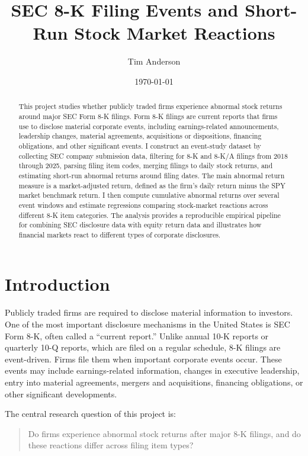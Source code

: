 \documentclass[12pt]{article}
\title{SEC 8-K Filing Events and Short-Run Stock Market Reactions}
\author{Tim Anderson}
\date{\today}
\begin{document}
	
	\maketitle
	
	\begin{abstract}
		This project studies whether publicly traded firms experience abnormal stock returns around major SEC Form 8-K filings. Form 8-K filings are current reports that firms use to disclose material corporate events, including earnings-related announcements, leadership changes, material agreements, acquisitions or dispositions, financing obligations, and other significant events. I construct an event-study dataset by collecting SEC company submission data, filtering for 8-K and 8-K/A filings from 2018 through 2025, parsing filing item codes, merging filings to daily stock returns, and estimating short-run abnormal returns around filing dates. The main abnormal return measure is a market-adjusted return, defined as the firm's daily return minus the SPY market benchmark return. I then compute cumulative abnormal returns over several event windows and estimate regressions comparing stock-market reactions across different 8-K item categories. The analysis provides a reproducible empirical pipeline for combining SEC disclosure data with equity return data and illustrates how financial markets react to different types of corporate disclosures.
	\end{abstract}
	
	\section{Introduction}
	
	Publicly traded firms are required to disclose material information to investors. One of the most important disclosure mechanisms in the United States is SEC Form 8-K, often called a ``current report.'' Unlike annual 10-K reports or quarterly 10-Q reports, which are filed on a regular schedule, 8-K filings are event-driven. Firms file them when important corporate events occur. These events may include earnings-related information, changes in executive leadership, entry into material agreements, mergers and acquisitions, financing obligations, or other significant developments.
	
	The central research question of this project is:
	
	\begin{quote}
		Do firms experience abnormal stock returns after major 8-K filings, and do these reactions differ across filing item types?
	\end{quote}
	
\end{document}

